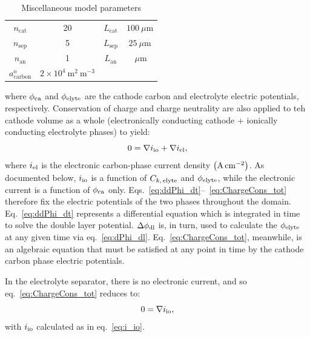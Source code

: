 \documentclass{elsarticle}
\begin{document}
\begin{table}[h!]
\begin{center}
\begin{tabular}{ |cc|cc| } 
    \hline
    $n_\mathrm{cat}$ & 20 & $L_\mathrm{cat}$ & $100 ~ \mu \mathrm{m}$ \\
    $n_\mathrm{sep}$ & 5 & $L_\mathrm{sep}$ & $25 ~ \mu \mathrm{m}$ \\
    $n_\mathrm{an}$ & 1 & $L_\mathrm{an}$ & $~ \mu \mathrm{m}$ \\
    $a^\mathrm{o}_\mathrm{carbon}$ & $2 \times 10^{4} ~ \mathrm{m}^{2} ~ \mathrm{m}^{-3}$ & & \\
    \hline
\end{tabular}
\caption{Miscellaneous model parameters}
\label{table:modelparams}
\end{center}
\end{table}

where $\phi_{\rm ca}$ and $\phi_{\rm elyte}$ are the cathode carbon and electrolyte electric potentials, respectively. Conservation of charge and charge neutrality are also applied to teh cathode volume as a whole (electronically conducting cathode + ionically conducting electrolyte phases) to yield:
\begin{equation}\label{eq:ChargeCons_tot}
    0 = \nabla i_{\rm io} + \nabla i_{\rm el},
\end{equation}
where $i_{\rm el}$ is the electronic carbon-phase current density $\left({\rm A\,cm^{-2}} \right)$. As documented below, $i_{\rm io}$ is a function of $C_{k,\,{\rm elyte}}$ and $\phi_{\rm elyte}$, while the electronic current is a function of $\phi_{\rm ca}$ only.  Eqs.~\ref{eq:ddPhi_dt}--~\ref{eq:ChargeCons_tot} therefore fix the electric potentials of the two phases throughout the domain. Eq.~\ref{eq:ddPhi_dt} represents a differential equation which is integrated in time to solve the double layer potential. $\Delta \phi_{\rm dl}$ is, in turn, used to calculate the $\phi_{\rm elyte}$ at any given time via eq.~\ref{eq:dPhi_dl}. Eq.~\ref{eq:ChargeCons_tot}, meanwhile, is an algebraic equation that must be satisfied at any point in time by the cathode carbon phase electric potentials. 

In the electrolyte separator, there is no electronic current, and so eq.~\ref{eq:ChargeCons_tot} reduces to:
\begin{equation}
    0 = \nabla i_{\rm io},
\end{equation}
with $i_{\rm io}$ calculated as in eq.~\ref{eq:i_io}.
\end{document}
